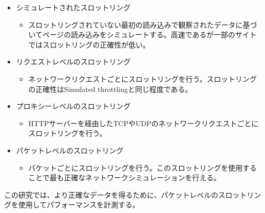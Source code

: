 \begin{itemize}
    \item シミュレートされたスロットリング
    \begin{itemize}
        \item スロットリングされていない最初の読み込みで観察されたデータに基づいてページの読み込みをシミュレートする。高速であるが一部のサイトではスロットリングの正確性が低い。
    \end{itemize}
    \item リクエストレベルのスロットリング
    \begin{itemize}
        \item ネットワークリクエストごとにスロットリングを行う。スロットリングの正確性はSimulated throttlingと同じ程度である。
    \end{itemize}
    \item プロキシーレベルのスロットリング
    \begin{itemize}
        \item HTTPサーバーを経由したTCPやUDPのネットワークリクエストごとにスロットリングを行う。
    \end{itemize}
    \item パケットレベルのスロットリング
    \begin{itemize}
        \item パケットごとにスロットリングを行う。このスロットリングを使用することで最も正確なネットワークシミュレーションを行える。
    \end{itemize}
\end{itemize}

この研究では、より正確なデータを得るために、パケットレベルのスロットリングを使用してパフォーマンスを計測する。